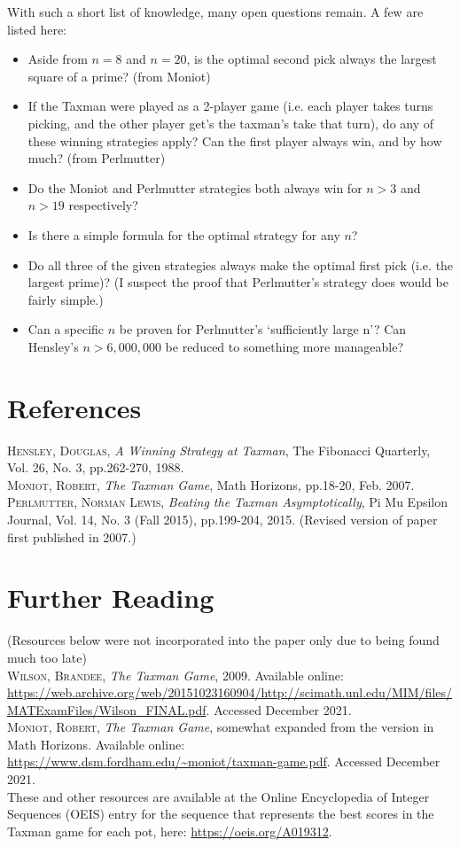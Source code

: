 \documentclass[a4paper,10pt]{amsart} %
\begin{document}
With such a short list of knowledge, many open questions remain. A few are listed here:
\begin{itemize}
    \item Aside from $n=8$ and $n=20$, is the optimal second pick always the largest square of a prime? (from Moniot)
    \item If the Taxman were played as a 2-player game (i.e. each player takes turns picking, and the other player get's the taxman's take that turn), do any of these winning strategies apply? Can the first player always win, and by how much? (from Perlmutter)
    \item Do the Moniot and Perlmutter strategies both always win for $n > 3$ and $n > 19$ respectively? 
    \item Is there a simple formula for the optimal strategy for any $n$? 
    \item Do all three of the given strategies always make the optimal first pick (i.e. the largest prime)? (I suspect the proof that Perlmutter's strategy does would be fairly simple.)
    \item Can a specific $n$ be proven for Perlmutter's `sufficiently large n'? Can Hensley's $n > 6,000,000$ be reduced to something more manageable? 
\end{itemize}



\section{References} \label{refs}
\noindent\textsc{Hensley, Douglas,} \textit{A Winning Strategy at Taxman}, The Fibonacci Quarterly, Vol. 26, No. 3, pp.262-270, 1988.\\
\textsc{Moniot, Robert}, \textit{The Taxman Game}, Math Horizons, pp.18-20, Feb. 2007. \\
\textsc{Perlmutter, Norman Lewis}, \textit{Beating the Taxman Asymptotically}, Pi Mu Epsilon Journal, Vol. 14, No. 3 (Fall 2015), pp.199-204, 2015. (Revised version of paper first published in 2007.) 

\section{Further Reading}\label{othercites}
\noindent(Resources below were not incorporated into the paper only due to being found much too late)\\
\textsc{Wilson, Brandee}, \textit{The Taxman Game}, 2009. Available online: \url{https://web.archive.org/web/20151023160904/http://scimath.unl.edu/MIM/files/MATExamFiles/Wilson_FINAL.pdf}. Accessed December 2021. \\
\textsc{Moniot, Robert}, \textit{The Taxman Game}, somewhat expanded from the version in Math Horizons. Available online: \url{https://www.dsm.fordham.edu/~moniot/taxman-game.pdf}. Accessed December 2021. \\
These and other resources are available at the Online Encyclopedia of Integer Sequences (OEIS) entry for the sequence that represents the best scores in the Taxman game for each pot, here: \url{https://oeis.org/A019312}. 
\end{document}
